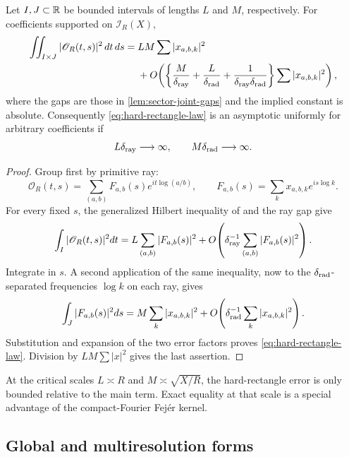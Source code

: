 \begin{theorem}
\label{thm:hard-rectangle}
Let $I,J\subset\mathbb R$ be bounded intervals of lengths $L$ and $M$,
respectively.  For coefficients supported on $\mathscr I_R(X)$,
\begin{equation}
 \begin{aligned}
 \iint_{I\times J}|\mathscr O_R(t,s)|^2\,dt\,ds
 ={}&LM\sum|x_{a,b,k}|^2\\
 &+O\!\left(
 \left\{
 \frac{M}{\delta_{\rm ray}}
 +\frac{L}{\delta_{\rm rad}}
 +\frac1{\delta_{\rm ray}\delta_{\rm rad}}
 \right\}
 \sum|x_{a,b,k}|^2
 \right),
 \end{aligned}
 \label{eq:hard-rectangle-law}
\end{equation}
where the gaps are those in \cref{lem:sector-joint-gaps} and the implied
constant is absolute.  Consequently \eqref{eq:hard-rectangle-law} is an
asymptotic uniformly for arbitrary coefficients if
\begin{equation}
 L\delta_{\rm ray}\longrightarrow\infty,
 \qquad
 M\delta_{\rm rad}\longrightarrow\infty.
 \label{eq:hard-rectangle-asymptotic-range}
\end{equation}
\end{theorem}

\begin{proof}
Group first by primitive ray:
\[
 \mathscr O_R(t,s)=
 \sum_{(a,b)}F_{a,b}(s)e^{it\log(a/b)},
 \qquad
 F_{a,b}(s)=\sum_kx_{a,b,k}e^{is\log k}.
\]
For every fixed $s$, the generalized Hilbert inequality of
\citet{MontgomeryVaughan1974} and the ray gap give
\[
 \int_I|\mathscr O_R(t,s)|^2dt
 =L\sum_{(a,b)}|F_{a,b}(s)|^2
 +O\!\left(\delta_{\rm ray}^{-1}
 \sum_{(a,b)}|F_{a,b}(s)|^2\right).
\]
Integrate in $s$.  A second application of the same inequality, now to
the $\delta_{\rm rad}$-separated frequencies $\log k$ on each ray,
gives
\[
 \int_J|F_{a,b}(s)|^2ds
 =M\sum_k|x_{a,b,k}|^2
 +O\!\left(\delta_{\rm rad}^{-1}
 \sum_k|x_{a,b,k}|^2\right).
\]
Substitution and expansion of the two error factors proves
\eqref{eq:hard-rectangle-law}.  Division by $LM\sum|x|^2$ gives the
last assertion.
\end{proof}

At the critical scales $L\asymp R$ and
$M\asymp\sqrt{X/R}$, the hard-rectangle error is only bounded relative
to the main term.  Exact equality at that scale is a special advantage
of the compact-Fourier Fej\'er kernel.

\subsection{Global and multiresolution forms}

